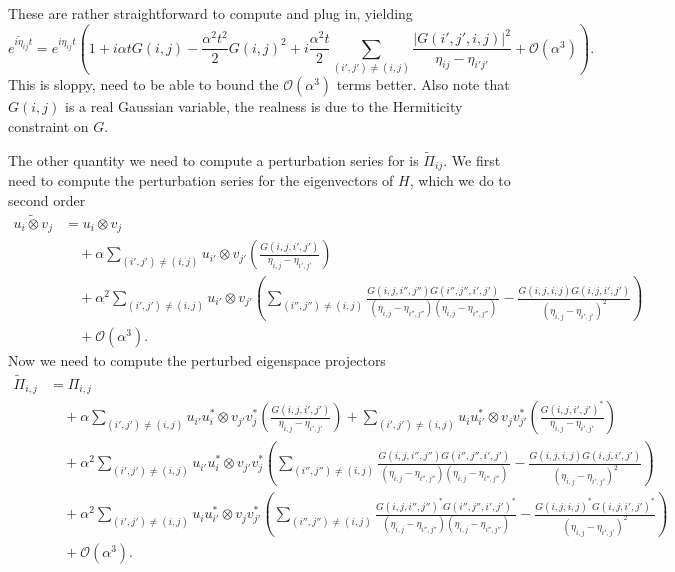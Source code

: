 \documentclass{article}
\newcommand{\parens}[1]{\left( #1 \right)}
\newcommand{\abs}[1]{\left| #1 \right|}
\newcommand{\bigo}[1]{\mathcal{O}\left( #1 \right)}
\begin{document}
These are rather straightforward to compute and plug in, yielding
\begin{equation}
    e^{i \widetilde{\eta}_{ij} t} = e^{i \eta_{ij} t}\parens{1 + i \alpha t G(i,j) - \frac{\alpha^2 t^2}{2} G(i,j)^2 + i \frac{\alpha^2 t}{2} \sum_{(i',j') \neq (i,j)}\frac{\abs{G(i',j',i,j)}^2}{\eta_{ij} - \eta_{i' j'}} + \bigo{\alpha^3}}.
\end{equation}
This is sloppy, need to be able to bound the $\bigo{\alpha^3}$ terms better. Also note that $G(i,j)$ is a real Gaussian variable, the realness is due to the Hermiticity constraint on $G$. 

The other quantity we need to compute a perturbation series for is $\widetilde{\Pi}_{ij}$. We first need to compute the perturbation series for the eigenvectors of $H$, which we do to second order
\begin{align}
    \widetilde{u_i \otimes v_j} &= u_i \otimes v_j \\
    &\quad + \alpha \sum_{(i',j') \neq (i,j)} u_{i'} \otimes v_{j'} \parens{  \frac{G(i,j,i',j')}{\eta_{i,j} - \eta_{i',j'}} } \\
    &\quad + \alpha^2 \sum_{(i',j') \neq (i,j)} u_{i'} \otimes v_{j'} \parens{ \sum_{(i'',j'') \neq (i,j)} \frac{G(i,j,i'',j'') G(i'',j'',i',j')}{(\eta_{i,j} - \eta_{i'',j''})(\eta_{i,j} - \eta_{i'',j''})} -  \frac{G(i,j,i,j) G(i,j,i',j')}{(\eta_{i,j} - \eta_{i',j'})^2}} \\
    &\quad + \bigo{\alpha^3}.
\end{align}
Now we need to compute the perturbed eigenspace projectors
\begin{align}
    \widetilde{\Pi}_{i,j} &= \Pi_{i,j} \\
    & \quad + \alpha \sum_{(i',j') \neq (i,j)} u_{i'} u_i^* \otimes v_{j'} v_j^* \parens{  \frac{G(i,j,i',j')}{\eta_{i,j} - \eta_{i',j'}} } + \sum_{(i',j') \neq (i,j)} u_i u_{i'}^* \otimes v_j v_{j'}^* \parens{  \frac{G(i,j,i',j')^*}{\eta_{i,j} - \eta_{i',j'}} } \\
    & \quad + \alpha^2 \sum_{(i',j') \neq (i,j)} u_{i'} u_i^* \otimes v_{j'} v_j^* \parens{ \sum_{(i'',j'') \neq (i,j)} \frac{G(i,j,i'',j'') G(i'',j'',i',j')}{(\eta_{i,j} - \eta_{i'',j''})(\eta_{i,j} - \eta_{i'',j''})} -  \frac{G(i,j,i,j) G(i,j,i',j')}{(\eta_{i,j} - \eta_{i',j'})^2}} \\
    & \quad + \alpha^2 \sum_{(i',j') \neq (i,j)} u_i u_{i'}^* \otimes v_j v_{j'}^* \parens{ \sum_{(i'',j'') \neq (i,j)} \frac{G(i,j,i'',j'')^* G(i'',j'',i',j')^*}{(\eta_{i,j} - \eta_{i'',j''})(\eta_{i,j} - \eta_{i'',j''})} -  \frac{G(i,j,i,j)^* G(i,j,i',j')^*}{(\eta_{i,j} - \eta_{i',j'})^2}} \\
    & \quad + \bigo{\alpha^3}.
\end{align}
\end{document}
